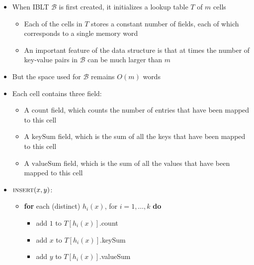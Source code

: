 \begin{itemize}
  \item When IBLT $\mathcal B$ is first created, it initializes a lookup table $T$ of $m$ cells
  \begin{itemize}
	  \item Each of the cells in $T$ stores a constant number of fields, each of which corresponds to a single memory word
  	\item An important feature of the data structure is that at times the number of key-value pairs in $\mathcal B$ can be much larger than $m$
  \end{itemize}
	\item But the space used for $\mathcal B$ remains $O(m)$ words
	\item Each cell contains three field:
  \begin{itemize}
		\item A $\text{count}$ field, which counts the number of entries that have been mapped to this cell
		\item A $\text{keySum}$ field, which is the sum of all the keys that have been mapped to this cell
		\item A $\text{valueSum}$ field, which is the sum of all the values that have been mapped to this cell
  \end{itemize}
  \item $\textsc{insert}(x,y)$:
  \begin{itemize}
    \item \textbf{for} each (distinct) $h_i(x)$, for $i=1, \dots, k$ \textbf{do}
    \begin{itemize}
      \item add $1$ to $T[h_i(x)]$.count
      \item add $x$ to $T[h_i(x)]$.keySum
      \item add $y$ to $T[h_i(x)]$.valueSum
    \end{itemize}
  \end{itemize}


\end{itemize}
